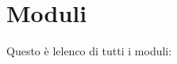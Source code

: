 \section{Moduli}
Questo è l\textquotesingle{}elenco di tutti i moduli\+:\begin{DoxyCompactList}
\item {}
\end{DoxyCompactList}
